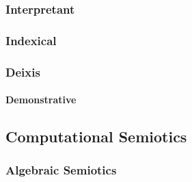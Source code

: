 \subsubsection{Interpretant}\label{sec:interpretant}

\subsubsection{Indexical}\label{sec:indexical}

\subsubsection{Deixis}\label{sec:deixis}

\paragraph{Demonstrative}\label{sec:demonstrative}\hfill



\subsection{Computational Semiotics}\label{sec:computational_semiotics}

\subsubsection{Algebraic Semiotics}\label{sec:algebraic_semiotics}
